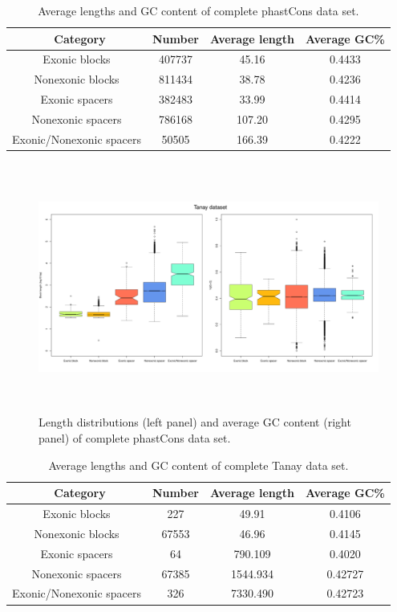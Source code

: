 \documentclass[12pt]{report}
\begin{document}
\begin{table}[ht]
\centering
\begin{tabular}{c c c c}
\hline\hline
\ Category & Number & Average length & Average GC\% \\ [0.5ex]
\hline
Exonic blocks & 407737 & 45.16 & 0.4433 \\
Nonexonic blocks & 811434 & 38.78 & 0.4236 \\
Exonic spacers & 382483 & 33.99 & 0.4414 \\
Nonexonic spacers & 786168 & 107.20 & 0.4295 \\
Exonic/Nonexonic spacers & 50505 & 166.39 & 0.4222 \\ [1ex] 
\hline
\end{tabular}
\caption[Caption for LOF]{\centering Average lengths and GC content of complete phastCons data set.}
\end{table}

\begin{figure}[htbp]
\centering
\includegraphics[width=\textwidth, height=82mm]{whole_tanay_lenghts_GC}
\caption{Length distributions (left panel) and average GC content (right panel) of complete phastCons data set.}
\label{fig:blocks_spacers_distributions_tan}
\end{figure}

\begin{table}[ht]
\centering
\begin{tabular}{c c c c}
\hline\hline
\ Category & Number & Average length & Average GC\% \\ [0.5ex]
\hline
Exonic blocks & 227 & 49.91 & 0.4106 \\
Nonexonic blocks & 67553 & 46.96 & 0.4145 \\
Exonic spacers & 64 & 790.109 & 0.4020 \\
Nonexonic spacers & 67385 & 1544.934 & 0.42727 \\
Exonic/Nonexonic spacers & 326 & 7330.490 & 0.42723 \\ [1ex] 
\hline
\end{tabular}
\caption[Caption for LOF]{\centering Average lengths and GC content of complete Tanay data set.}
\end{table}
\end{document}
